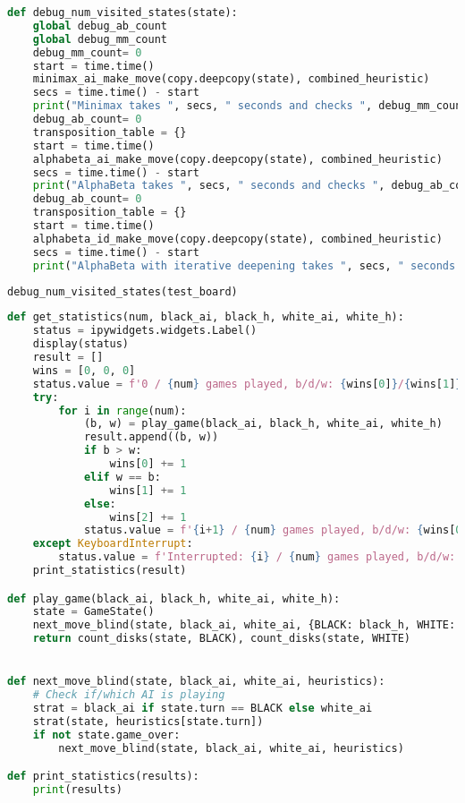 \begin{lstlisting}[language=Python]
def debug_num_visited_states(state):
    global debug_ab_count
    global debug_mm_count
    debug_mm_count= 0
    start = time.time()
    minimax_ai_make_move(copy.deepcopy(state), combined_heuristic)
    secs = time.time() - start
    print("Minimax takes ", secs, " seconds and checks ", debug_mm_count, "substates")
    debug_ab_count= 0
    transposition_table = {}
    start = time.time()
    alphabeta_ai_make_move(copy.deepcopy(state), combined_heuristic)
    secs = time.time() - start
    print("AlphaBeta takes ", secs, " seconds and checks ", debug_ab_count, "substates")
    debug_ab_count= 0
    transposition_table = {}
    start = time.time()
    alphabeta_id_make_move(copy.deepcopy(state), combined_heuristic)
    secs = time.time() - start
    print("AlphaBeta with iterative deepening takes ", secs, " seconds and checks ", debug_ab_count, "substates")
\end{lstlisting}

\begin{lstlisting}[language=Python]
debug_num_visited_states(test_board)
\end{lstlisting}

\begin{lstlisting}[language=Python]
def get_statistics(num, black_ai, black_h, white_ai, white_h):
    status = ipywidgets.widgets.Label()
    display(status)
    result = []
    wins = [0, 0, 0]
    status.value = f'0 / {num} games played, b/d/w: {wins[0]}/{wins[1]}/{wins[2]}'
    try:
        for i in range(num):
            (b, w) = play_game(black_ai, black_h, white_ai, white_h)
            result.append((b, w))
            if b > w:
                wins[0] += 1
            elif w == b:
                wins[1] += 1
            else:
                wins[2] += 1
            status.value = f'{i+1} / {num} games played, b/d/w: {wins[0]}/{wins[1]}/{wins[2]}'
    except KeyboardInterrupt:
        status.value = f'Interrupted: {i} / {num} games played, b/d/w: {wins[0]}/{wins[1]}/{wins[2]}'
    print_statistics(result)

def play_game(black_ai, black_h, white_ai, white_h):
    state = GameState()
    next_move_blind(state, black_ai, white_ai, {BLACK: black_h, WHITE: white_h})
    return count_disks(state, BLACK), count_disks(state, WHITE)


def next_move_blind(state, black_ai, white_ai, heuristics):
    # Check if/which AI is playing
    strat = black_ai if state.turn == BLACK else white_ai
    strat(state, heuristics[state.turn])
    if not state.game_over:
        next_move_blind(state, black_ai, white_ai, heuristics)

def print_statistics(results):
    print(results)
\end{lstlisting}

